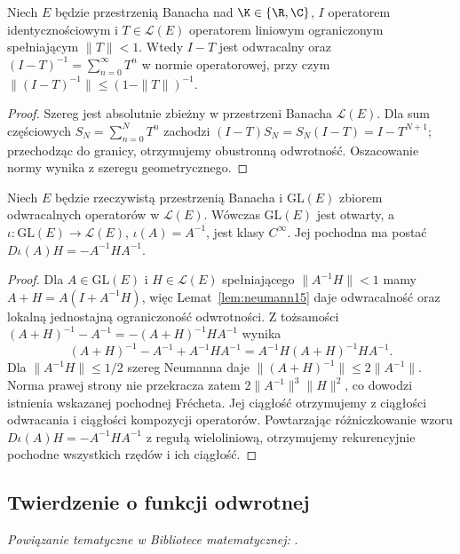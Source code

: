 \begin{lemat}
\label{lem:neumann15}
Niech $E$ będzie przestrzenią Banacha nad $\K\in\{\R,\C\}$, $I$ operatorem identycznościowym i $T\in\mathcal L(E)$ operatorem liniowym ograniczonym spełniającym $\|T\|<1$. Wtedy $I-T$ jest odwracalny oraz
$(I-T)^{-1}=\sum_{n=0}^\infty T^n$ w normie operatorowej, przy czym $\|(I-T)^{-1}\|\le(1-\|T\|)^{-1}$.
\end{lemat}
\begin{proof}
Szereg jest absolutnie zbieżny w przestrzeni Banacha $\mathcal L(E)$. Dla sum częściowych $S_N=\sum_{n=0}^N T^n$ zachodzi $(I-T)S_N=S_N(I-T)=I-T^{N+1}$; przechodząc do granicy, otrzymujemy obustronną odwrotność. Oszacowanie normy wynika z szeregu geometrycznego.
\end{proof}

\begin{stwierdzenie}
\label{prop:inverse-operator15}
Niech $E$ będzie rzeczywistą przestrzenią Banacha i $\mathrm{GL}(E)$ zbiorem odwracalnych operatorów w $\mathcal L(E)$. Wówczas $\mathrm{GL}(E)$ jest otwarty, a $\iota:\mathrm{GL}(E)\to\mathcal L(E)$, $\iota(A)=A^{-1}$, jest klasy $C^\infty$. Jej pochodna ma postać
$D\iota(A)H=-A^{-1}HA^{-1}$.
\end{stwierdzenie}
\begin{proof}
Dla $A\in\mathrm{GL}(E)$ i $H\in\mathcal L(E)$ spełniającego $\|A^{-1}H\|<1$ mamy $A+H=A(I+A^{-1}H)$, więc Lemat~\ref{lem:neumann15} daje odwracalność oraz lokalną jednostajną ograniczoność odwrotności. Z tożsamości
$(A+H)^{-1}-A^{-1}=-(A+H)^{-1}HA^{-1}$ wynika
\[
(A+H)^{-1}-A^{-1}+A^{-1}HA^{-1}
=A^{-1}H(A+H)^{-1}HA^{-1}.
\]
Dla $\|A^{-1}H\|\le1/2$ szereg Neumanna daje $\|(A+H)^{-1}\|\le2\|A^{-1}\|$. Norma prawej strony nie przekracza zatem $2\|A^{-1}\|^3\|H\|^2$, co dowodzi istnienia wskazanej pochodnej Frécheta. Jej ciągłość otrzymujemy z ciągłości odwracania i ciągłości kompozycji operatorów. Powtarzając różniczkowanie wzoru $D\iota(A)H=-A^{-1}HA^{-1}$ z regułą wieloliniową, otrzymujemy rekurencyjnie pochodne wszystkich rzędów i ich ciągłość.
\end{proof}

\subsection{Twierdzenie o funkcji odwrotnej}

\noindent\emph{Powiązanie tematyczne w Bibliotece matematycznej:} .

